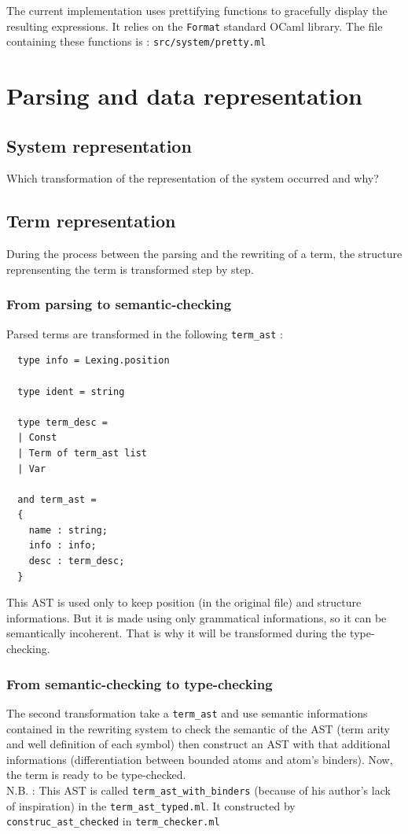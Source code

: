 \documentclass[12pt,a4paper]{article}
\begin{document}
The current implementation uses prettifying functions to gracefully
display the resulting expressions. It relies on the \verb?Format?
standard OCaml library. The file containing these functions is :
\verb?src/system/pretty.ml?

\section{Parsing and data representation}
\label{data}

\subsection{System representation}
\label{data-system}
Which transformation of the representation of the system occurred and
why?

\subsection{Term representation}
\label{data-term}
During the process between the parsing and the rewriting of a term, the
structure reprensenting the term is transformed step by step.

\subsubsection{From parsing to semantic-checking}
Parsed terms are transformed in the following \verb?term_ast? :
\begin{lstlisting}
  type info = Lexing.position

  type ident = string

  type term_desc =
  | Const
  | Term of term_ast list
  | Var

  and term_ast =
  {
    name : string;
    info : info;
    desc : term_desc;
  }
\end{lstlisting}

This AST is used only to keep position (in the original file) and structure
informations.
But it is made using only grammatical informations, so it can be
semantically incoherent. That is why it will be transformed during the
type-checking.

\subsubsection{From semantic-checking to type-checking}
The second transformation take a \verb?term_ast? and use semantic informations
contained in the rewriting system to check the semantic of the AST (term
arity and well definition of each symbol)  then
construct an AST with that additional informations (differentiation between
bounded atoms and atom's binders). Now, the term is ready to be type-checked.
\\
N.B. : This AST is called \verb?term_ast_with_binders? (because of his
author's lack of inspiration) in the \verb?term_ast_typed.ml?.
It constructed by \verb?construc_ast_checked? in \verb?term_checker.ml?
\end{document}
